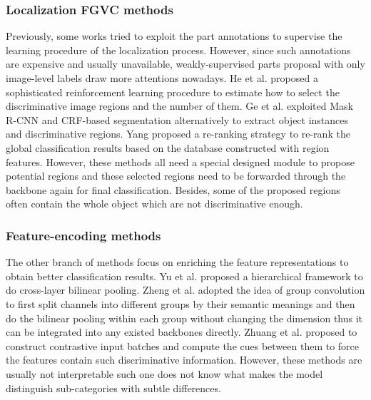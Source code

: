 \documentclass[10pt,twocolumn,letterpaper]{article}
\begin{document}
\subsubsection{Localization FGVC methods}
Previously, some works \cite{branson2014bird, wei2016maskcnn} tried to exploit the part annotations to supervise the learning procedure of the localization process. However, since such annotations are expensive and usually unavailable, weakly-supervised parts proposal with only image-level labels draw more attentions nowadays. He et al. \cite{article} proposed a sophisticated reinforcement learning procedure to estimate how to select the discriminative image regions and the number of them. Ge et al. \cite{ge2019weakly} exploited Mask R-CNN and CRF-based segmentation alternatively to extract object instances and discriminative regions. Yang \cite{yang2021rerank} proposed a re-ranking strategy to re-rank the global classification results based on the database constructed with region features. However, these methods all need a special designed module to propose potential regions and these selected regions need to be forwarded through the backbone again for final classification. Besides, some of the proposed regions often contain the whole object which are not discriminative enough.

\subsubsection{Feature-encoding methods}
The other branch of methods focus on enriching the feature representations to obtain better classification results. Yu et al. \cite{yu2018hierarchical} proposed a hierarchical framework to do cross-layer bilinear pooling. Zheng et al. \cite{zheng2019learning} adopted the idea of group convolution to first split channels into different groups by their semantic meanings and then do the bilinear pooling within each group without changing the dimension thus it can be integrated into any existed backbones directly. Zhuang et al. \cite{zhuang2020learning} proposed to construct contrastive input batches and compute the cues between them to force the features contain such discriminative information. However, these methods are usually not interpretable such one does not know what makes the model distinguish sub-categories with subtle differences.
\end{document}
